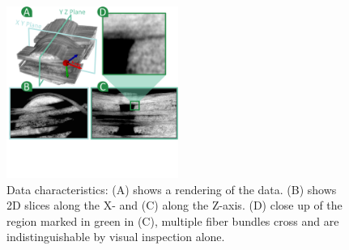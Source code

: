 
\begin{figure}[tb]
\centering
\includegraphics[width=0.5\textwidth, trim = 0mm 110mm 0mm 0mm, clip,]{images_pvis/figure1}
\caption{Data characteristics: (A) shows a rendering of the data. (B) shows 2D slices along the X- and (C) along the Z-axis. (D) close up of the region marked in green in (C), multiple fiber bundles cross and are indistinguishable by visual inspection alone. }
\label{fig:data-char}
\end{figure}
